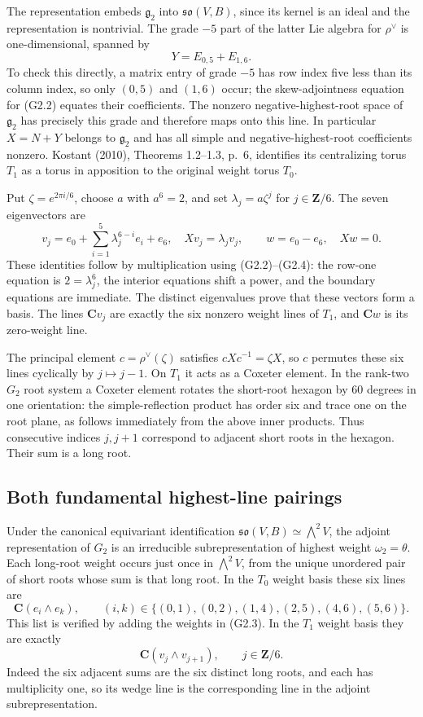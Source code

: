 The representation embeds $\mathfrak g_2$ into
$\mathfrak{so}(V,B)$, since its kernel is an ideal and the
representation is nontrivial.  The grade $-5$ part of the latter
Lie algebra for $\rho^\vee$ is one-dimensional, spanned by
\[
                         Y=E_{0,5}+E_{1,6}.
 \tag{G2.4}
\]
To check this directly, a matrix entry of grade $-5$ has row
index five less than its column index, so only $(0,5)$ and
$(1,6)$ occur; the skew-adjointness equation for (G2.2) equates
their coefficients.  The nonzero negative-highest-root space
of $\mathfrak g_2$ has precisely this grade and therefore maps
onto this line.  In particular $X=N+Y$ belongs to
$\mathfrak g_2$ and has all simple and negative-highest-root
coefficients nonzero.  Kostant (2010), Theorems 1.2--1.3,
p.~6, identifies its centralizing torus $T_1$ as a torus in
apposition to the original weight torus $T_0$.

Put $\zeta=e^{2\pi i/6}$, choose $a$ with $a^6=2$, and set
$\lambda_j=a\zeta^j$ for $j\in\mathbf Z/6$.  The seven
eigenvectors are
\[
 v_j=e_0+\sum_{i=1}^{5}\lambda_j^{6-i}e_i+e_6,
       \quad Xv_j=\lambda_jv_j,
       \qquad w=e_0-e_6,\quad Xw=0.
 \tag{G2.5}
\]
These identities follow by multiplication using (G2.2)--(G2.4):
the row-one equation is $2=\lambda_j^6$, the interior equations
shift a power, and the boundary equations are immediate.
The distinct eigenvalues prove that these vectors form a basis.
The lines $\mathbf C v_j$ are exactly the six nonzero weight
lines of $T_1$, and $\mathbf Cw$ is its zero-weight line.

The principal element $c=\rho^\vee(\zeta)$ satisfies
$cXc^{-1}=\zeta X$, so $c$ permutes these six lines cyclically
by $j\mapsto j-1$.  On $T_1$ it acts as a Coxeter element.
In the rank-two $G_2$ root system a Coxeter element rotates the
short-root hexagon by $60$ degrees in one orientation: the
simple-reflection product has order six and trace one on the
root plane, as follows immediately from the above inner products.
Thus consecutive indices $j,j+1$ correspond to adjacent short
roots in the hexagon.  Their sum is a long root.

\subsection{Both fundamental highest-line pairings}
Under the canonical equivariant identification
$\mathfrak{so}(V,B)\simeq\bigwedge^2V$, the adjoint
representation of $G_2$ is an irreducible subrepresentation
of highest weight $\omega_2=\theta$.  Each long-root weight
occurs just once in $\bigwedge^2V$, from the unique unordered
pair of short roots whose sum is that long root.  In the
$T_0$ weight basis these six lines are
\[
 \mathbf C(e_i\wedge e_k),\qquad
 (i,k)\in\{(0,1),(0,2),(1,4),(2,5),(4,6),(5,6)\}.
 \tag{G2.6}
\]
This list is verified by adding the weights in (G2.3).
In the $T_1$ weight basis they are exactly
\[
                         \mathbf C(v_j\wedge v_{j+1}),
                         \qquad j\in\mathbf Z/6.
 \tag{G2.7}
\]
Indeed the six adjacent sums are the six distinct long roots,
and each has multiplicity one, so its wedge line is the
corresponding line in the adjoint subrepresentation.

